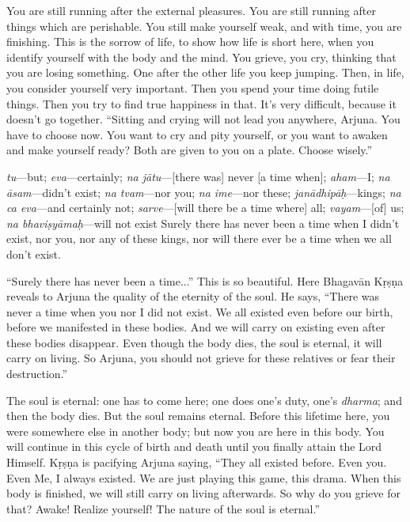 You are still running after the external pleasures. You are still running after things which are perishable. You still make yourself weak, and with time, you are finishing. This is the sorrow of life, to show how life is short here, when you identify yourself with the body and the mind. You grieve, you cry, thinking that you are losing something. One after the other life you keep jumping. Then, in life, you consider yourself very important. Then you spend your time doing futile things. Then you try to find true happiness in that. It’s very difficult, because it doesn’t go together. “Sitting and crying will not lead you anywhere, Arjuna. You have to choose now. You want to cry and pity yourself, or you want to awaken and make yourself ready? Both are given to you on a plate. Choose wisely.”

{%
  \textit{tu}---but; 
  \textit{eva}---certainly; 
  \textit{na jātu}---[there was] never [a time when]; 
  \textit{aham}---I; 
  \textit{na āsam}---didn't exist; 
  \textit{na tvam}---nor you; 
  \textit{na ime}---nor these; 
  \textit{janādhipāḥ}---kings; 
  \textit{na ca eva}---and certainly not; 
  \textit{sarve}---[will there be a time where] all; 
  \textit{vayam}---[of] us; 
  \textit{na bhaviṣyāmaḥ}---will not exist
}
{%
  Surely there has never been a time when I didn't exist, nor you, nor any of these kings, nor will there ever be a time when we all don't exist.
}

“Surely there has never been a time...” This is so beautiful. Here Bhagavān Kṛṣṇa reveals to Arjuna the quality of the eternity of the soul. He says, “There was never a time when you nor I did not exist. We all existed even before our birth, before we manifested in these bodies. And we will carry on existing even after these bodies disappear. Even though the body dies, the soul is eternal, it will carry on living. So Arjuna, you should not grieve for these relatives or fear their destruction.”

The soul is eternal: one has to come here; one does one’s duty, one’s \textit{dharma}; and then the body dies. But the soul remains eternal. Before this lifetime here, you were somewhere else in another body; but now you are here in this body. You will continue in this cycle of birth and death until you finally attain the Lord Himself. Kṛṣṇa is pacifying Arjuna saying, “They all existed before. Even you. Even Me, I always existed. We are just playing this game, this drama. When this body is finished, we will still carry on living afterwards. So why do you grieve for that? Awake! Realize yourself! The nature of the soul is eternal.”

